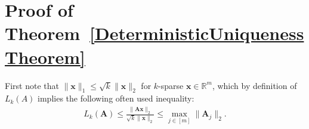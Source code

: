 \documentclass[9pt,twocolumn]{pnas-new}
\begin{document}
%


\section{Proof of Theorem~\ref{DeterministicUniquenessTheorem}}\label{DUT}

First note that $\|\mathbf{x}\|_1 \leq \sqrt{k} \|\mathbf{x}\|_2$ for $k$-sparse $\mathbf{x} \in \mathbb{R}^m$, which by definition of $L_k(A)$ implies the following often used inequality:
\begin{align}\label{delrho}
L_k(\mathbf{A}) \leq \frac{\|\mathbf{A}\mathbf{x}\|_2}{\sqrt{k} \|\mathbf{x}\|_2} %
\leq  \max_{j \in [m]}\|\mathbf{A}_j\|_2.
\end{align}
\end{document}

